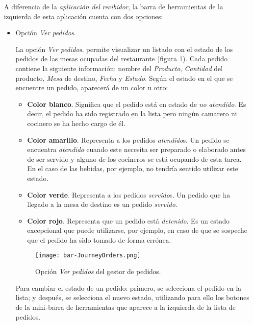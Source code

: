A diferencia de la \emph{aplicación del recibidor}, la barra de herramientas de 
la izquierda de esta aplicación cuenta con dos opciones:
\begin{itemize}
\item Opción \emph{Ver pedidos}.

La opción \emph{Ver pedidos}, permite visualizar un listado con el estado de
los pedidos de las mesas ocupadas del restaurante (figura
\ref{fig:bar-JourneyOrders}). Cada pedido contiene la siguiente información:
nombre del \emph{Producto}, \emph{Cantidad} del producto, \emph{Mesa} de
destino, \emph{Fecha} y \emph{Estado}. Según el estado en el que se encuentre
un pedido, aparecerá de un color u otro:
  \begin{itemize}
  \item \textbf{Color blanco}. Significa que el pedido está en estado de
  \emph{no atendido}. Es decir, el pedido ha sido registrado en la lista pero
  ningún camarero ni cocinero se ha hecho cargo de él.
  \item \textbf{Color amarillo}. Representa a los pedidos \emph{atendido}s.
  Un pedido se encuentra \emph{atendido} cuando este necesita ser preparado o
  elaborado antes de ser servido y alguno de los cocineros se está ocupando de 
  esta tarea. En el caso de las bebidas, por ejemplo, no tendría sentido
  utilizar este estado.
  \item \textbf{Color verde}. Representa a los pedidos \emph{servido}s. Un
  pedido que ha llegado a la mesa de destino es un pedido \emph{servido}.
  \item \textbf{Color rojo}. Representa que un pedido está \emph{detenido}.
  Es un estado excepcional que puede utilizarse, por ejemplo, en caso
  de que se sospeche que el pedido ha sido tomado de forma errónea.
  \end{itemize}

  \begin{figure}[H]
    \begin{center}
      \texttt{[image: bar-JourneyOrders.png]}
      \caption{Opción \emph{Ver pedidos} del gestor de pedidos.}
      \label{fig:bar-JourneyOrders}
    \end{center}
  \end{figure}

Para cambiar el estado de un pedido: primero, se selecciona el pedido en la 
lista; y después, se selecciona el nuevo estado, utilizando para ello los
botones de la mini-barra de herramientas que aparece a la izquierda de la
lista de pedidos.


\end{itemize}
